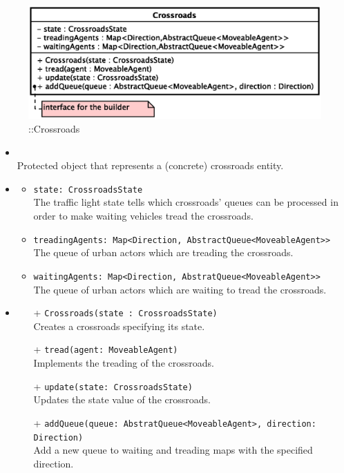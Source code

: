 \begin{figure}[h]
\centering
\includegraphics[scale=0.6,keepaspectratio]{images/solution/app/backend/crossroads.eps}
\caption{\pReactiveComponent::Crossroads}
\label{fig:sd-app-crossroads}
\end{figure}
\FloatBarrier
\begin{itemize}
  \item \textbf{\descr} \\
    Protected object that represents a (concrete) crossroads entity.
  \item \textbf{\attrs}
  \begin{itemize}
    \item \texttt{state: CrossroadsState} \\
The traffic light state tells which crossroads' queues can be processed in
order to make waiting vehicles tread the crossroads.
    \item \texttt{treadingAgents: Map<Direction, AbstractQueue<MoveableAgent>>} \\
The queue of urban actors which are treading the crossroads.
    \item \texttt{waitingAgents: Map<Direction, AbstratQueue<MoveableAgent>>} \\
The queue of urban actors which are waiting to tread the crossroads. 
  \end{itemize}
  \item \textbf{\ops}
  \begin{itemize}
    \item[+] \texttt{Crossroads(state : CrossroadsState)} \\
Creates a crossroads specifying its state.
    \item[+] \texttt{tread(agent: MoveableAgent)} \\
Implements the treading of the crossroads.
    \item[+] \texttt{update(state: CrossroadsState)} \\
Updates the state value of the crossroads.
    \item[+] \texttt{addQueue(queue: AbstratQueue<MoveableAgent>, direction: 
Direction)} \\
Add a new queue to waiting and treading maps with the specified direction.
  \end{itemize}
\end{itemize}
